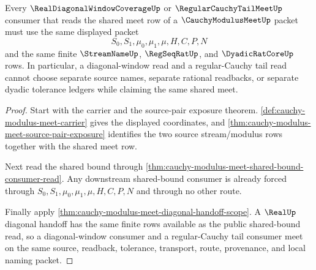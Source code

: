 \begin{theorem}
\label{thm:cauchy-modulus-meet-common-window-coherence}
Every $\RealDiagonalWindowCoverageUp$ or $\RegularCauchyTailMeetUp$ consumer that reads the shared meet row of a $\CauchyModulusMeetUp$ packet must use the same displayed packet
$$
S_0,S_1,\mu_0,\mu_1,\mu,H,C,P,N
$$
and the same finite $\StreamNameUp$, $\RegSeqRatUp$, and $\DyadicRatCoreUp$ rows. In particular, a diagonal-window read and a regular-Cauchy tail read cannot choose separate source names, separate rational readbacks, or separate dyadic tolerance ledgers while claiming the same shared meet.
\end{theorem}
\begin{proof}
Start with the carrier and the source-pair exposure theorem. \autoref{def:cauchy-modulus-meet-carrier} gives the displayed coordinates, and \autoref{thm:cauchy-modulus-meet-source-pair-exposure} identifies the two source stream/modulus rows together with the shared meet row.

Next read the shared bound through \autoref{thm:cauchy-modulus-meet-shared-bound-consumer-read}. Any downstream shared-bound consumer is already forced through $S_0,S_1,\mu_0,\mu_1,\mu,H,C,P,N$ and through no other route.

Finally apply \autoref{thm:cauchy-modulus-meet-diagonal-handoff-scope}. A $\RealUp$ diagonal handoff has the same finite rows available as the public shared-bound read, so a diagonal-window consumer and a regular-Cauchy tail consumer meet on the same source, readback, tolerance, transport, route, provenance, and local naming packet.
\end{proof}

